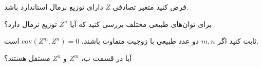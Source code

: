 \problem{}
فرض کنید متغیر تصادفی \( Z \) دارای توزیع نرمال استاندارد باشد. 

\subproblem{} 
برای توان‌های طبیعی مختلف بررسی کنید که آیا \( Z^n \) توزیع نرمال دارد؟ 

\subproblem{}  ثابت کنید اگر \( m, n \) دو عدد طبیعی با زوجیت متفاوت باشند، \( \text{cov}(Z^m, Z^n) = 0 \) است. 

\subproblem{} آیا در قسمت ب، \( Z^m \) و \( Z^n \) مستقل هستند؟

